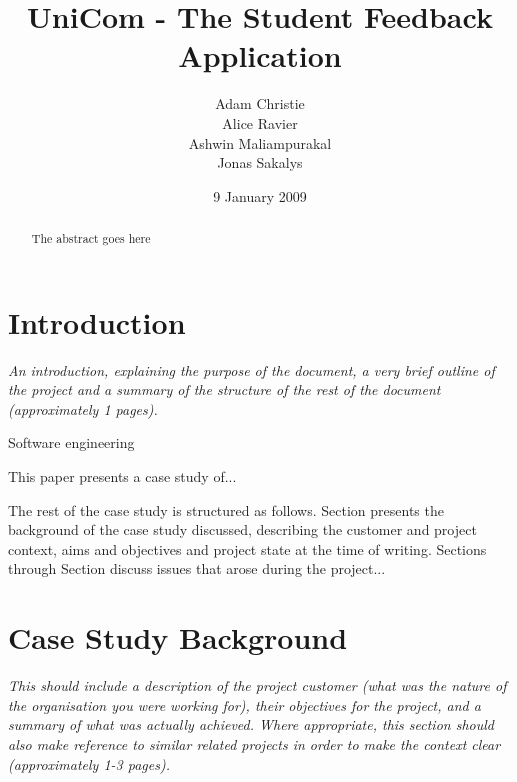 \documentclass{l3proj}
\begin{document}
\title{UniCom - The Student Feedback Application}

\author{Adam Christie \\
        Alice Ravier \\
        Ashwin Maliampurakal \\
        Jonas Sakalys}

\date{9 January 2009}

\maketitle

\begin{abstract}

The abstract goes here

\end{abstract}

\educationalconsent

\newpage

\section{Introduction}

\textit{An introduction, explaining the purpose of the document, a very brief outline of the project and a summary of the structure of the rest of the document (approximately 1 pages).}


Software engineering

This paper presents a case study of...


The rest of the case study is structured as follows.  Section
 presents the background of the case study
discussed, describing the customer and project context, aims and
objectives and project state at the time of writing.  Sections
 through Section  discuss issues that
arose during the project...

\section{Case Study Background}

\textit{This should include a description of the project customer (what was the nature of the organisation you were working for), their objectives for the project, and a summary of what was actually achieved. Where appropriate, this section should also make reference to similar related projects in order to make the context clear (approximately 1-3 pages).}
\end{document}
